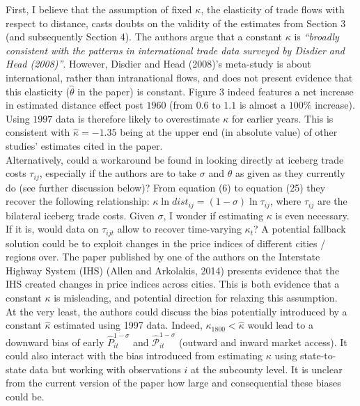\documentclass[10pt, final]{article}
\begin{document}
First, I believe that the assumption of fixed $\kappa$, the elasticity of trade flows with respect to distance, casts doubts on the validity of the estimates from Section 3 (and subsequently Section 4). 
The authors argue that a constant $\kappa$ is \textit{``broadly consistent with the patterns in international trade data surveyed by Disdier and Head (2008)''}. However, Disdier and Head (2008)'s meta-study is about international, rather than intranational flows, and does not present evidence that this elasticity ($\hat{\theta}$ in the paper) is constant. Figure 3 indeed features a net increase in estimated distance effect post $1960$ (from $0.6$ to $1.1$ is almost a $100 \%$ increase). Using $1997$ data is therefore likely to overestimate $\kappa$ for earlier years. This is consistent with $\hat{\kappa} = -1.35$ being at the upper end (in absolute value) of other studies' estimates cited in the paper. 
\\
Alternatively, could a workaround be found in looking directly at iceberg trade costs $\tau_{ij}$, especially if the authors are to take $\sigma$ and $\theta$ as given as they currently do (see further discussion below)?
From equation (6) to equation (25) they recover the following relationship: $ \kappa \ln dist_{ij} = (1 - \sigma) \ln \tau_{ij}$, where $\tau_{ij}$ are the bilateral iceberg trade costs. Given $\sigma$, I wonder if estimating $\kappa$ is even necessary. If it is, would data on $\tau_{ijt}$ allow to recover time-varying $\kappa_t$?
A potential fallback solution could be to exploit changes in the price indices of different cities / regions over. The paper published by one of the authors on the Interstate Highway System (IHS) (Allen and Arkolakis, 2014) presents evidence that the IHS created changes in price indices across cities. This is both evidence that a constant $\kappa$ is misleading, and potential direction for relaxing this assumption.
\\
At the very least, the authors could discuss the bias potentially introduced by a constant $\hat{\kappa}$ estimated using 1997 data.
Indeed, $\kappa_{1800} < \hat{\kappa}$ would lead to a downward bias of early $\hat{P}_{it}^{1-\sigma}$ and $\hat{\mathcal{P}}_{it}^{1-\sigma}$ (outward and inward market access). It could also interact with the bias introduced from estimating $\kappa$ using state-to-state data but working with observations $i$ at the subcounty level. It is unclear from the current version of the paper how large and consequential these biases could be.
\\ 
\end{document}
